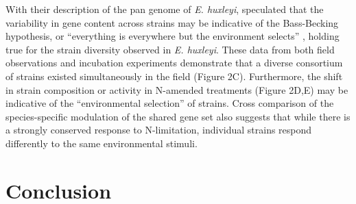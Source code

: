 With their description of the pan genome of \textit{E. huxleyi}, \citet{Read2013} speculated that the variability in gene content across strains may be indicative of the Bass-Becking hypothesis, or ``everything is everywhere but the environment selects'' \citep{Baas-Becking1934, DeWit2006}, holding true for the strain diversity observed in \textit{E. huxleyi}.  These data from both field observations and incubation experiments demonstrate that a diverse consortium of strains existed simultaneously in the field (Figure 2C). Furthermore, the shift in strain composition or activity in N-amended treatments (Figure 2D,E) may be indicative of the ``environmental selection'' of strains. Cross comparison of the species-specific modulation of the shared gene set also suggests that while there is a strongly conserved response to N-limitation, individual strains respond differently to the same environmental stimuli. \par


\section{Conclusion}

